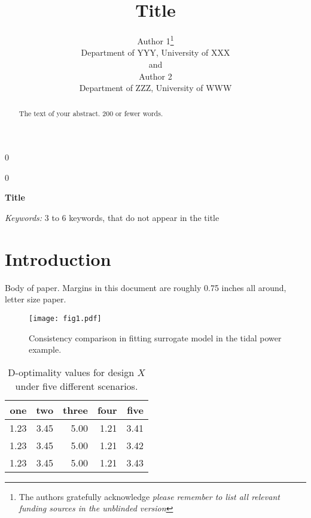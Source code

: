\documentclass[12pt]{article}
\newcommand{\blind}{0}
\begin{document}
%

\def\spacingset#1{\renewcommand{\baselinestretch}%
{#1}\small\normalsize} \spacingset{1}



\blind
{
  \title{\bf Title}
  \author{Author 1\thanks{
    The authors gratefully acknowledge \textit{please remember to list all relevant funding sources in the unblinded version}}\hspace{.2cm}\\
    Department of YYY, University of XXX\\
    and \\
    Author 2 \\
    Department of ZZZ, University of WWW}
  \maketitle
} \fi

\blind
{
  \bigskip
  \bigskip
  \bigskip
  \begin{center}
    {\LARGE\bf Title}
\end{center}
  \medskip
} \fi

\bigskip
\begin{abstract}
The text of your abstract. 200 or fewer words.
\end{abstract}

\noindent%
{\it Keywords:}  3 to 6 keywords, that do not appear in the title
\vfill

\newpage
\spacingset{1.9} %
\section{Introduction}
\label{sec:intro}

Body of paper.  Margins in this document are roughly 0.75 inches all
around, letter size paper.

\begin{figure}
\begin{center}
\texttt{[image: fig1.pdf]}
\end{center}
\caption{Consistency comparison in fitting surrogate model in the tidal
power example. \label{fig:first}}
\end{figure}

\begin{table}
\caption{D-optimality values for design $X$ under five different scenarios.  \label{tab:tabone}}
\begin{center}
\begin{tabular}{rrrrr}
one & two & three & four & five\\\hline
1.23 & 3.45 & 5.00 & 1.21 & 3.41 \\
1.23 & 3.45 & 5.00 & 1.21 & 3.42 \\
1.23 & 3.45 & 5.00 & 1.21 & 3.43 \\
\end{tabular}
\end{center}
\end{table}
\end{document}
